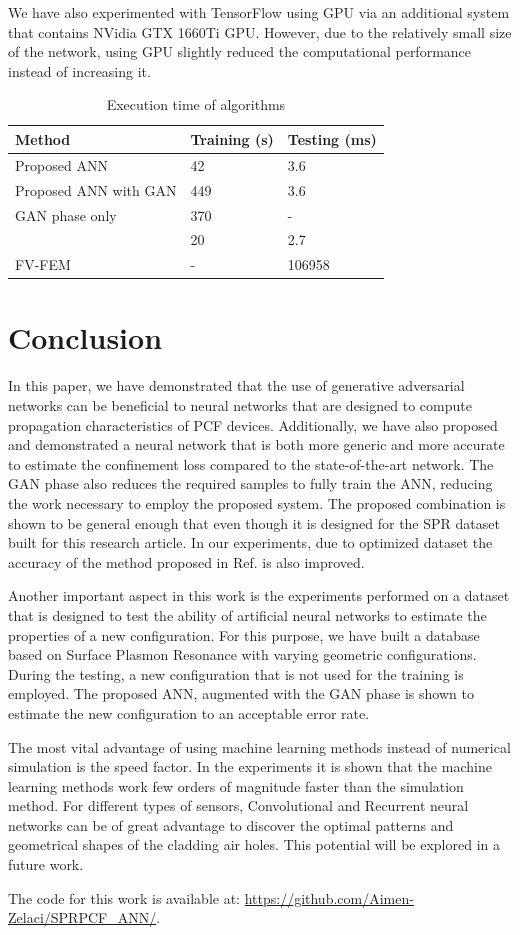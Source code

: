 \documentclass[journal]{IEEEtran}
\begin{document}
We have also experimented with TensorFlow using GPU via an additional system that contains NVidia GTX 1660Ti GPU. However, due to the relatively small size of the network, using GPU slightly reduced the computational performance instead of increasing it.

\begin{table}
	\caption{Execution time of algorithms}
	\centering
	\begin{tabular}{l|l|l}
		Method    			  &  Training (s) & Testing (ms) \\\hline
		Proposed ANN 		  &  42 & 3.6 \\
		Proposed ANN with GAN & 449 & 3.6 \\
		GAN phase only        & 370 &  -  \\
		\cite{paper0}		  &  20 & 2.7 \\
		FV-FEM		   		  &  -  & 106958
	\end{tabular}
	\label{tbl:timing}
\end{table}

\section{Conclusion}
\label{sec:conc}

In this paper, we have demonstrated that the use of generative adversarial networks can be beneficial to neural networks that are designed to compute propagation characteristics of PCF devices. Additionally, we have also proposed and demonstrated a neural network that is both more generic and more accurate to estimate the confinement loss compared to the state-of-the-art network. The GAN phase also reduces the required samples to fully train the ANN, reducing the work necessary to employ the proposed system. The proposed combination is shown to be general enough that even though it is designed for the SPR dataset built for this research article. In our experiments, due to optimized dataset the accuracy of the method proposed in Ref. \cite{paper0} is also improved.

Another important aspect in this work is the experiments performed on a dataset that is designed to test the ability of artificial neural networks to estimate the properties of a new configuration. For this purpose, we have built a database based on Surface Plasmon Resonance with varying geometric configurations. During the testing, a new configuration that is not used for the training is employed. The proposed ANN, augmented with the GAN phase is shown to estimate the new configuration to an acceptable error rate.

The most vital advantage of using machine learning methods instead of numerical simulation is the speed factor. In the experiments it is shown that the machine learning methods work few orders of magnitude faster than the simulation method. For different types of sensors, Convolutional and Recurrent neural networks can be of great advantage to discover the optimal patterns and geometrical shapes of the cladding air holes. This potential will be explored in a future work.

The code for this work is available at: \url{https://github.com/Aimen-Zelaci/SPRPCF_ANN/}.


	
\end{document}
